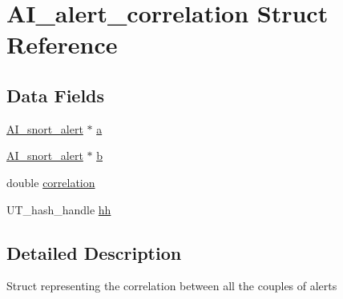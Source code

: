 \hypertarget{structAI__alert__correlation}{
\section{AI\_\-alert\_\-correlation Struct Reference}
\label{structAI__alert__correlation}
}
\subsection*{Data Fields}
\begin{DoxyCompactItemize}
\item 
\hyperlink{struct__AI__snort__alert}{AI\_\-snort\_\-alert} $\ast$ \hyperlink{structAI__alert__correlation_a8737f171e1c1b2305c8fe77101d6aeb7}{a}
\item 
\hyperlink{struct__AI__snort__alert}{AI\_\-snort\_\-alert} $\ast$ \hyperlink{structAI__alert__correlation_a478f1a6f18f9c083b203efdf776379cd}{b}
\item 
double \hyperlink{structAI__alert__correlation_aad417b2126ae26d7576f006a3dbcdc81}{correlation}
\item 
UT\_\-hash\_\-handle \hyperlink{structAI__alert__correlation_ad3020a87936a2193a92f09331401ad42}{hh}
\end{DoxyCompactItemize}


\subsection{Detailed Description}
Struct representing the correlation between all the couples of alerts 

